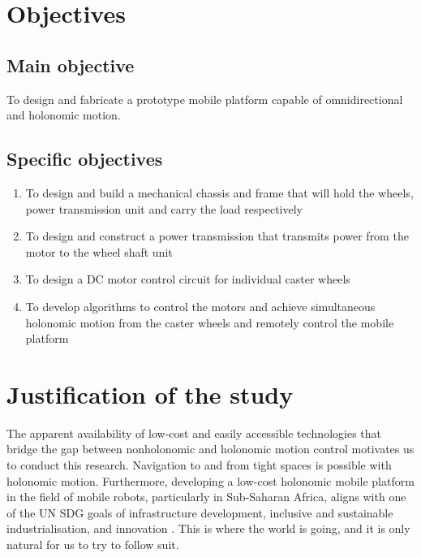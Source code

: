 \section{Objectives}

\subsection{Main objective}

To design and fabricate a prototype mobile platform capable of omnidirectional and holonomic motion.

\subsection{Specific objectives}

\begin{enumerate}
	\item To design and build a mechanical chassis and frame that will hold the wheels, power transmission unit and carry the load respectively \vspace*{.2cm}
	\item To design and construct a power transmission that transmits power from the motor to the wheel shaft unit\vspace*{.2cm}
	\item To design a \ac{DC} motor control circuit for individual caster wheels\vspace*{.2cm}
	\item To develop  algorithms to control the motors and achieve simultaneous holonomic motion from the caster wheels and remotely control the mobile platform\vspace*{.2cm}
	
\end{enumerate}

\section{Justification of the study}
The apparent availability of low-cost and easily accessible technologies that bridge the gap between nonholonomic and holonomic motion control motivates us to conduct this research. Navigation to and from tight spaces is possible with holonomic motion. Furthermore, developing a low-cost holonomic mobile platform in the field of mobile robots, particularly in Sub-Saharan Africa, aligns with one of the \ac{UN} \ac{SDG} goals of infrastructure development, inclusive and sustainable industrialisation, and innovation \cite{noauthor_goal_nodate}.
This is where the world is going, and it is only natural for us to try to follow suit.

